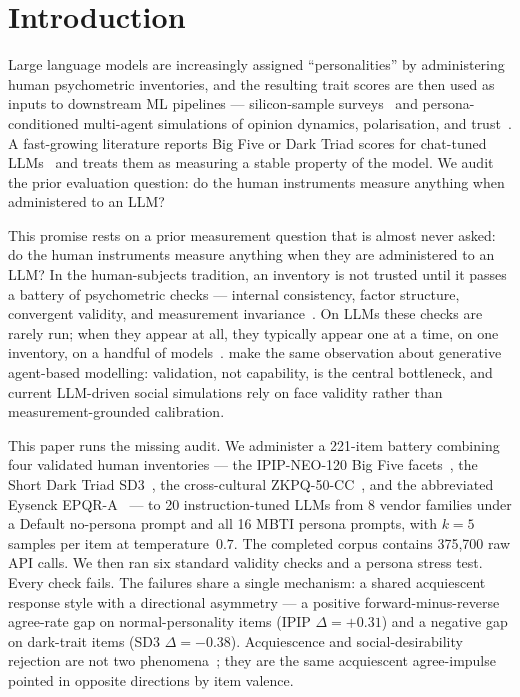 \documentclass{article}
\begin{document}
\section{Introduction}
\label{sec:intro}

Large language models are increasingly assigned ``personalities'' by administering human psychometric inventories, and the resulting trait scores are then used as inputs to downstream ML pipelines --- silicon-sample surveys~\citep{argyle2023one,horton2023homo,aher2023using,park2023generative,ferreira2025matching} and persona-conditioned multi-agent simulations of opinion dynamics, polarisation, and trust~\citep{chuang2023simulating,cau2025language,chuang2025debate,mannekote2025roleplaying}. A fast-growing literature reports Big Five or Dark Triad scores for chat-tuned LLMs~\citep{miotto2023gpt3,serapio2025psychometric,jiang2023personallm,huang2023psychobench,bodroza2024personality} and treats them as measuring a stable property of the model. We audit the prior evaluation question: do the human instruments measure anything when administered to an LLM?

This promise rests on a prior measurement question that is almost never asked: do the human instruments measure anything when they are administered to an LLM? In the human-subjects tradition, an inventory is not trusted until it passes a battery of psychometric checks --- internal consistency, factor structure, convergent validity, and measurement invariance~\citep{cronbach1951coefficient,kaiser1960application,vandenberg2000review}. On LLMs these checks are rarely run; when they appear at all, they typically appear one at a time, on one inventory, on a handful of models~\citep{suhr2025challenging,pelet2025persistent}. \citet{larooij2025validation} make the same observation about generative agent-based modelling: validation, not capability, is the central bottleneck, and current LLM-driven social simulations rely on face validity rather than measurement-grounded calibration.

This paper runs the missing audit. We administer a 221-item battery combining four validated human inventories --- the IPIP-NEO-120 Big Five facets~\citep{johnson2014measuring}, the Short Dark Triad SD3~\citep{jones2014introducing}, the cross-cultural ZKPQ-50-CC~\citep{aluja2006cross}, and the abbreviated Eysenck EPQR-A~\citep{francis1992development} --- to 20 instruction-tuned LLMs from 8 vendor families under a Default no-persona prompt and all 16 MBTI persona prompts, with $k=5$ samples per item at temperature~$0.7$. The completed corpus contains 375{,}700 raw API calls. We then ran six standard validity checks and a persona stress test. Every check fails. The failures share a single mechanism: a shared acquiescent response style with a directional asymmetry --- a positive forward-minus-reverse agree-rate gap on normal-personality items (IPIP $\Delta=+0.31$) and a negative gap on dark-trait items (SD3 $\Delta=-0.38$). Acquiescence and social-desirability rejection are not two phenomena~\citep{couch1960yeasayers,crowne1960social,paulhus1991response,billiet2000modeling}; they are the same acquiescent agree-impulse pointed in opposite directions by item valence.
\end{document}
